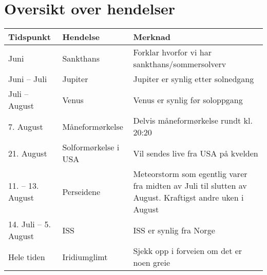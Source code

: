 \documentclass[../SommerstjernerA4.tex]{subfiles}
\begin{document}
\section{Oversikt over hendelser}

\begin{tabular}{llp{}} \hline
Tidspunkt            	& Hendelse            	& Merknad \\ \hline
Juni                 	& Sankthans           	& Forklar hvorfor vi har sankthans/sommersolverv \\
Juni -- Juli         	& Jupiter             	& Jupiter er synlig etter solnedgang \\
Juli -- August       	& Venus               	& Venus er synlig før soloppgang \\
7. August            	& Måneformørkelse     	& Delvis måneformørkelse rundt kl. 20:20 \\
21. August           	& Solformørkelse i USA	& Vil sendes live fra USA på kvelden \\
11. -- 13. August    	& Perseidene          	& Meteorstorm som egentlig varer fra midten av Juli til slutten av August. Kraftigst andre uken i August \\
14. Juli -- 5. August	& ISS                 	& ISS er synlig fra Norge \\ 
Hele tiden           	& Iridiumglimt        	& Sjekk opp i forveien om det er noen greie \\
\hline
\end{tabular}
\end{document}

